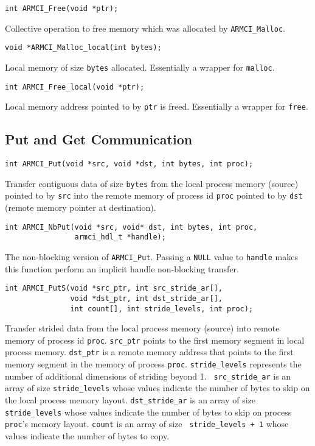 \documentclass[10pt]{article}
\begin{document}
\begin{verbatim}
int ARMCI_Free(void *ptr);
\end{verbatim}
Collective operation to free memory which was allocated by 
{\tt ARMCI\_Malloc}.

\begin{verbatim}
void *ARMCI_Malloc_local(int bytes);
\end{verbatim}
Local memory of size {\tt bytes} allocated. Essentially a wrapper for
{\tt malloc}.

\begin{verbatim}
int ARMCI_Free_local(void *ptr);
\end{verbatim}
Local memory address pointed to by {\tt ptr} is freed. Essentially a
wrapper for {\tt free}.

\subsection{Put and Get Communication}

\begin{verbatim}
int ARMCI_Put(void *src, void *dst, int bytes, int proc);
\end{verbatim}
Transfer contiguous data of size {\tt bytes} from the local process
memory (source) pointed to by {\tt src} into the remote memory of
process id {\tt proc} pointed to by {\tt dst} (remote memory pointer
at destination).

\begin{verbatim}
int ARMCI_NbPut(void *src, void* dst, int bytes, int proc, 
                armci_hdl_t *handle);
\end{verbatim}
The non-blocking version of {\tt ARMCI\_Put}. Passing a {\tt NULL}
value to {\tt handle} makes this function perform an implicit handle
non-blocking transfer.

\begin{verbatim}
int ARMCI_PutS(void *src_ptr, int src_stride_ar[],
               void *dst_ptr, int dst_stride_ar[],
               int count[], int stride_levels, int proc);
\end{verbatim}
Transfer strided data from the local process memory (source) into
remote memory of process id {\tt proc}. {\tt src\_ptr} points to the
first memory segment in local process memory. {\tt dst\_ptr} is a
remote memory address that points to the first memory segment in the
memory of process {\tt proc}. {\tt stride\_levels} represents the
number of additional dimensions of striding beyond 1. {\tt
src\_stride\_ar} is an array of size {\tt stride\_levels} whose values
indicate the number of bytes to skip on the local process memory
layout. {\tt dst\_stride\_ar} is an array of size {\tt stride\_levels}
whose values indicate the number of bytes to skip on process {\tt
proc}'s memory layout. {\tt count} is an array of size {\tt
stride\_levels + 1} whose values indicate the number of bytes to copy.
\end{document}

